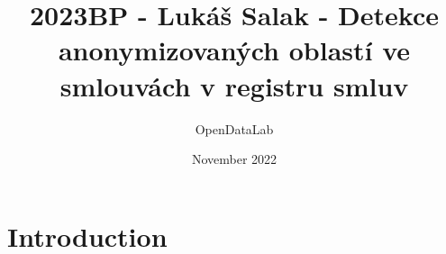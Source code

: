 \documentclass{article}
\title{2023BP - Lukáš Salak - Detekce anonymizovaných oblastí ve smlouvách v registru smluv}
\author{OpenDataLab }
\date{November 2022}
\begin{document}
\maketitle

\section{Introduction}
\end{document}
